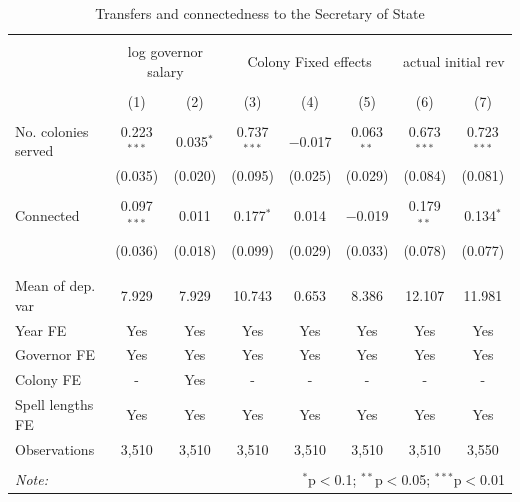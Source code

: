 \documentclass[a4paper]{article}\usepackage[]{graphicx}\usepackage[]{color}
\begin{document}
\begin{table}[!htbp] \centering 
  \caption{Transfers and connectedness to the Secretary of State} 
  \label{tab:tran} 
\scriptsize 
\begin{tabular}{@{\extracolsep{5pt}}lccccccc} 
\\[-1.8ex]\hline 
\hline \\[-1.8ex] 
 & \multicolumn{2}{c}{log governor salary} & \multicolumn{3}{c}{Colony Fixed effects} & \multicolumn{2}{c}{actual initial rev} \\ 
\\[-1.8ex] & (1) & (2) & (3) & (4) & (5) & (6) & (7)\\ 
\hline \\[-1.8ex] 
 No. colonies served & 0.223$^{***}$ & 0.035$^{*}$ & 0.737$^{***}$ & $-$0.017 & 0.063$^{**}$ & 0.673$^{***}$ & 0.723$^{***}$ \\ 
  & (0.035) & (0.020) & (0.095) & (0.025) & (0.029) & (0.084) & (0.081) \\ 
  & & & & & & & \\ 
 Connected & 0.097$^{***}$ & 0.011 & 0.177$^{*}$ & 0.014 & $-$0.019 & 0.179$^{**}$ & 0.134$^{*}$ \\ 
  & (0.036) & (0.018) & (0.099) & (0.029) & (0.033) & (0.078) & (0.077) \\ 
  & & & & & & & \\ 
\hline \\[-1.8ex] 
Mean of dep. var & 7.929 & 7.929 & 10.743 & 0.653 & 8.386 & 12.107 & 11.981 \\ 
Year FE & Yes & Yes & Yes & Yes & Yes & Yes & Yes \\ 
Governor FE & Yes & Yes & Yes & Yes & Yes & Yes & Yes \\ 
Colony FE & - & Yes & - & - & - & - & - \\ 
Spell lengths FE & Yes & Yes & Yes & Yes & Yes & Yes & Yes \\ 
Observations & 3,510 & 3,510 & 3,510 & 3,510 & 3,510 & 3,510 & 3,550 \\ 
\hline 
\hline \\[-1.8ex] 
\textit{Note:}  & \multicolumn{7}{r}{$^{*}$p$<$0.1; $^{**}$p$<$0.05; $^{***}$p$<$0.01} \\ 
\end{tabular} 
\end{table} 
\end{document}
